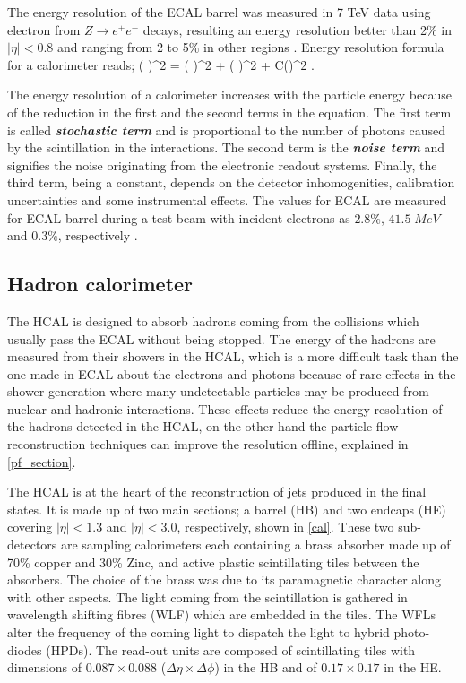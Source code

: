 The energy resolution of the ECAL barrel was measured in 7 TeV data using electron from $Z \rightarrow e^+e^-$ decays, resulting an energy resolution better than 2\% in $|\eta|<0.8$ and ranging from 2 to 5\% in other regions \cite{ecalm}. Energy resolution formula for a calorimeter reads;
\be
\left( \right)^2 = \left( \right)^2 + \left( \right)^2 + C\left(\eta\right)^2 \; .
\label{res_eq_ecal}
\ee

The energy resolution of a calorimeter increases with the particle energy because of the reduction in the first and the second terms in the equation. The first term is called \emph{\bf{stochastic term}} and is proportional to the number of photons caused by the scintillation in the interactions. The second term is the \emph{\bf{noise term}} and signifies the noise originating from the electronic readout systems. Finally, the third term, being a constant, depends on the detector inhomogenities, calibration uncertainties and some instrumental effects. The values for ECAL are measured for ECAL barrel during a test beam with incident electrons as $2.8\%$, $41.5 \; MeV$ and $0.3\%$, respectively \cite{Ingram2007}.

\subsection{Hadron calorimeter}

The HCAL\cite{CMS:1997xji} is designed to absorb hadrons coming from the collisions which usually pass the ECAL without being stopped. The energy of the hadrons are measured from their showers in the HCAL, which is a more difficult task than the one made in ECAL about the electrons and photons because of rare effects in the shower generation where many undetectable particles may be produced from nuclear and hadronic interactions. These effects reduce the energy resolution of the hadrons detected in the HCAL, on the other hand the particle flow reconstruction techniques can improve the resolution offline, explained in \autoref{pf_section}.

The HCAL is at the heart of the reconstruction of jets produced in the final states. It is made up of two main sections; a barrel (HB) and two endcaps (HE) covering $|\eta|<1.3$ and $|\eta|<3.0$, respectively, shown in \autoref{cal}. These two sub-detectors are sampling calorimeters each containing a brass absorber made up of 70\% copper and 30\% Zinc, and active plastic scintillating tiles between the absorbers. The choice of the brass was due to its paramagnetic character along with other aspects. The light coming from the scintillation is gathered in wavelength shifting fibres (WLF) which are embedded in the tiles. The WFLs alter the frequency of the coming light to dispatch the light to hybrid photo-diodes (HPDs). The read-out units are composed of scintillating tiles with dimensions of $0.087\times0.088$ ($\Delta\eta \times\Delta\phi$) in the HB and of $0.17\times0.17$ in the HE.

